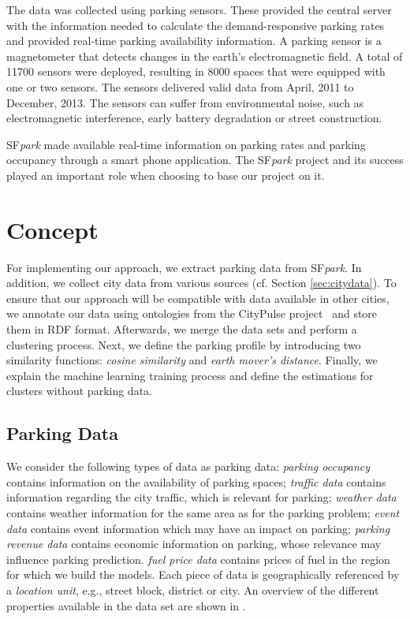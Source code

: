 The data was collected using parking sensors. These provided the central server with the information needed to calculate the demand-responsive parking rates and provided real-time parking availability information. A parking sensor is a magnetometer that detects changes in the earth's electromagnetic field. A total of 11700 sensors were deployed, resulting in 8000 spaces that were equipped with one or two sensors. The sensors delivered valid data from April, 2011 to December, 2013. The sensors can suffer from environmental noise, such as electromagnetic interference, early battery degradation or street construction. 

SF\textit{park} made available real-time information on parking rates and parking occupancy through a smart phone application. The SF\textit{park} project and its success played an important role when choosing to base our project on it.

\section{Concept}
For implementing our approach, we extract parking data from SF\textit{park}. In addition, we collect city data from various sources (cf. Section \ref{sec:citydata}). To ensure that our approach will be compatible with data available in other cities, we annotate our data using ontologies from the CityPulse project~\cite{city_pulse} and store them in RDF format. Afterwards, we merge the data sets and perform a clustering process. Next, we define the parking profile by introducing two similarity functions: \textit{cosine similarity} and \textit{earth mover's distance}.
Finally, we explain the machine learning training process and define the estimations for clusters without parking data.


\subsection{Parking Data}
We consider the following types of data as parking data: \textit{parking occupancy} contains information on the availability of parking spaces; \textit{traffic data} contains information regarding the city traffic, which is relevant for parking; \textit{weather data} contains weather information for the same area as for the parking problem; \textit{event data} contains event information which may have an impact on parking; \textit{parking revenue data} contains economic information on parking, whose relevance may influence parking prediction. \textit{fuel price data} contains prices of fuel in the region for which we build the models.
Each piece of data is geographically referenced by a \textit{location unit}, e.g., street block, district or city. 
An overview of the different properties available in the data set are shown in .

